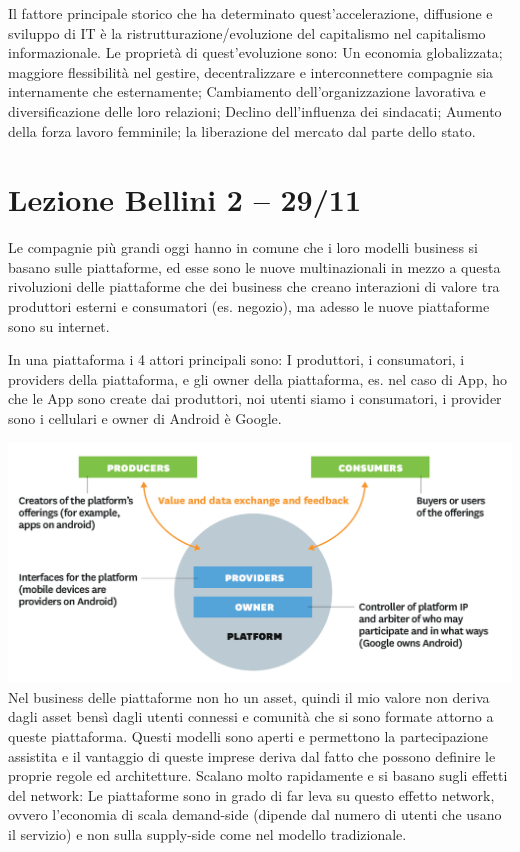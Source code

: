 \documentclass[]{article}
\begin{document}
Il fattore principale storico che ha determinato quest'accelerazione,
diffusione e sviluppo di IT è la ristrutturazione/evoluzione del
capitalismo nel capitalismo informazionale. Le proprietà di
quest'evoluzione sono: Un economia globalizzata; maggiore flessibilità
nel gestire, decentralizzare e interconnettere compagnie sia
internamente che esternamente; Cambiamento dell'organizzazione
lavorativa e diversificazione delle loro relazioni; Declino
dell'influenza dei sindacati; Aumento della forza lavoro femminile; la
liberazione del mercato dal parte dello stato.
\section*{Lezione Bellini 2 -- 29/11}

Le compagnie più grandi oggi hanno in comune che i loro modelli business
si basano sulle piattaforme, ed esse sono le nuove multinazionali in
mezzo a questa rivoluzioni delle piattaforme che dei business che creano
interazioni di valore tra produttori esterni e consumatori (es.
negozio), ma adesso le nuove piattaforme sono su internet.

In una piattaforma i 4 attori principali sono: I produttori, i
consumatori, i providers della piattaforma, e gli owner della
piattaforma, es. nel caso di App, ho che le App sono create dai
produttori, noi utenti siamo i consumatori, i provider sono i cellulari
e owner di Android è Google.

\includegraphics[scale=0.3]{image4.png}
Nel business delle piattaforme non ho un asset, quindi il mio valore non
deriva dagli asset bensì dagli utenti connessi e comunità che si sono
formate attorno a queste piattaforma. Questi modelli sono aperti e
permettono la partecipazione assistita e il vantaggio di queste imprese
deriva dal fatto che possono definire le proprie regole ed architetture.
Scalano molto rapidamente e si basano sugli effetti del network: Le
piattaforme sono in grado di far leva su questo effetto network, ovvero
l'economia di scala demand-side (dipende dal numero di utenti che usano
il servizio) e non sulla supply-side come nel modello tradizionale.
\end{document}
